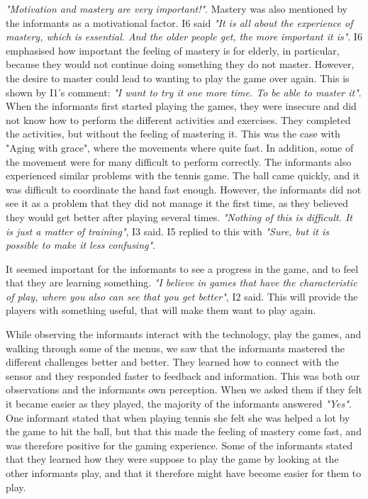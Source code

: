 \emph{"Motivation and mastery are very important!"}. Mastery was also mentioned by the informants as a motivational factor. I6 said \emph{"It is all about the experience of mastery, which is essential. And the older people get, the more important it is"}. I6 emphasised how important the feeling of mastery is for elderly, in particular, because they would not continue doing something they do not master. However, the desire to master could lead to wanting to play the game over again. This is shown by I1's comment: \emph{"I want to try it one more time. To be able to master it"}. When the informants first started playing the games, they were insecure and did not know how to perform the different activities and exercises. They completed the activities, but without the feeling of mastering it. This was the case with "Aging with grace", where the movements where quite fast. In addition, some of the movement were for many difficult to perform correctly. The informants also experienced similar problems with the tennis game. The ball came quickly, and it was difficult to coordinate the hand fast enough. However, the informants did not see it as a problem that they did not manage it the first time, as they believed they would get better after playing several times. \emph{"Nothing of this is difficult. It is just a matter of training"}, I3 said. I5 replied to this with \emph{"Sure, but it is possible to make it less confusing"}.  

It seemed important for the informants to see a progress in the game, and to feel that they are learning something. \emph{"I believe in games that have the characteristic of play, where you also can see that you get better"}, I2 said. This will provide the players with something useful, that will make them want to play again.

While observing the informants interact with the technology, play the games, and walking through some of the menus, we saw that the informants mastered the different challenges better and better. They learned how to connect with the sensor and they responded faster to feedback and information. This was both our observations and the informants own perception. When we asked them if they felt it became easier as they played, the majority of the informants answered \emph{"Yes"}. One informant stated that when playing tennis she felt she was helped a lot by the game to hit the ball, but that this made the feeling of mastery come fast, and was therefore positive for the gaming experience. Some of the informants stated that they learned how they were suppose to play the game by looking at the other informants play, and that it therefore might have become easier for them to play. 

